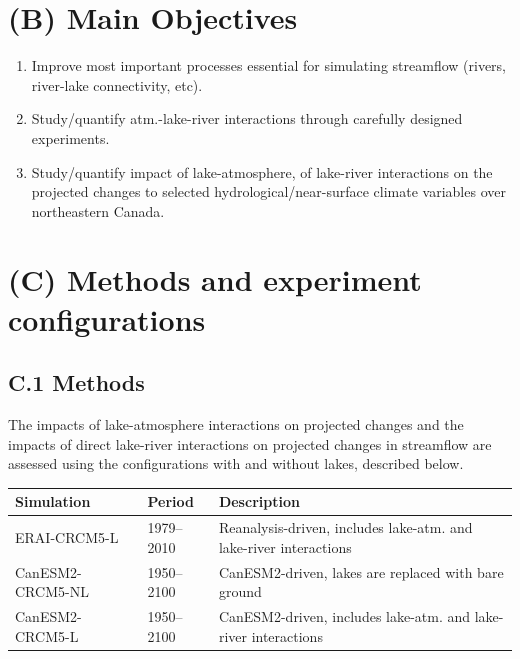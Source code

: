 \documentclass[a0,landscape]{a0poster}
\begin{document}
\begin{multicols*}{3}

\color{DarkSlateGray} %

\section*{(B) Main Objectives}
\begin{tcolorbox}[colback=white,colframe=green!40!black]
  \begin{enumerate}
  \item Improve most important processes essential for simulating streamflow (rivers, river-lake connectivity, etc).
  \item Study/quantify atm.-lake-river interactions through carefully designed experiments.
  \item Study/quantify impact of lake-atmosphere, of lake-river interactions on the projected changes to selected hydrological/near-surface climate variables over northeastern Canada.
  \end{enumerate}
\end{tcolorbox}


\section*{(C) Methods and experiment configurations}
\subsection*{C.1 Methods}
%
The impacts of lake-atmosphere interactions on
projected changes and the impacts of direct lake-river interactions on projected
changes in streamflow are assessed using the configurations with and without
lakes, described below.\\[0.5cm]

\begin{minipage}[t]{\linewidth}
\center
\small
\begin{tabular}{lll}
\toprule
\textbf{Simulation} & \textbf{Period} & \textbf{Description}\\
\midrule
ERAI-CRCM5-L     & 1979--2010 & Reanalysis-driven, includes lake-atm. and lake-river interactions\\
CanESM2-CRCM5-NL & 1950--2100 & CanESM2-driven, lakes are replaced with bare ground \\
CanESM2-CRCM5-L  & 1950--2100 & CanESM2-driven, includes lake-atm. and lake-river interactions \\
\bottomrule
\end{tabular}
\end{minipage}


\end{multicols*}
\end{document}
